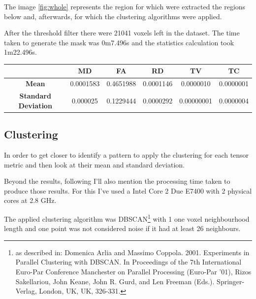 \documentclass[a4paper,11pt]{report}
\begin{document}
    The image \ref{fig:whole} represents the region for which were extracted the regions below and, afterwards, for which the clustering algorithms were applied.

    After the threshold filter there were 21041 voxels left in the dataset. The time taken to generate the mask was 0m7.496s and the statistics calculation took 1m22.496s.

    \begin{tabular}{| c | c | c | c | c | c |}
      \hline
        & \textbf{MD} & \textbf{FA} & \textbf{RD} & \textbf{TV} & \textbf{TC} \\ \hline
       \textbf{Mean} & 0.0001583 & 0.4651988 & 0.0001146 & 0.0000010 & 0.0000001 \\ \hline
       \textbf{Standard Deviation} & 0.000025 & 0.1229444 & 0.0000292 & 0.00000001 & 0.0000004 \\ \hline 
    \end{tabular}

    \subsection{Clustering}\label{subsec:clustering}
    In order to get closer to identify a pattern to apply the clustering for each tensor metric and then look at their mean and standard deviation.

    Beyond the results, following I'll also mention the processing time taken to produce those results. For this I've used a Intel Core 2 Due E7400 with 2 physical cores at 2.8 GHz.

    The applied clustering algorithm was DBSCAN\footnote{as described in: Domenica Arlia and Massimo Coppola. 2001. Experiments in Parallel Clustering with DBSCAN. In Proceedings of the 7th International Euro-Par Conference Manchester on Parallel Processing (Euro-Par '01), Rizos Sakellariou, John Keane, John R. Gurd, and Len Freeman (Eds.). Springer-Verlag, London, UK, UK, 326-331.} with 1 one voxel neighbourhood length and one point was not considered noise if it had at least 26 neighbours.

    \newpage
\end{document}
